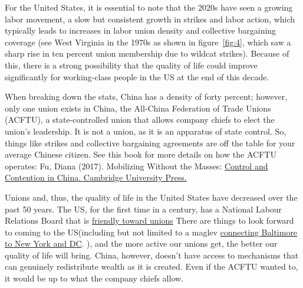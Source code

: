 \documentclass[11pt]{article}\usepackage[]{graphicx}\usepackage[]{xcolor}
\begin{document}
For the United States, it is essential to note that the 2020s have seen a growing labor movement, a slow but consistent growth in strikes and labor action, which typically leads to increases in labor union density and collective bargaining coverage (see West Virginia in the 1970s as shown in figure~\ref{fig:4}, which saw a sharp rise in ten percent union membership due to wildcat strikes). Because of this, there is a strong possibility that the quality of life could improve significantly for working-class people in the US at the end of this decade. 

When breaking down the stats, China has a density of forty percent; however, only one union exists in China, the All-China Federation of Trade Unions (ACFTU), a state-controlled union that allows company chiefs to elect the union's leadership. It is not a union, as it is an apparatus of state control. So, things like strikes and collective bargaining agreements are off the table for your average Chinese citizen. See this book for more details on how the ACFTU operates:  Fu, Diana (2017). Mobilizing Without the Masses: \href{https://www.amazon.com/Mobilizing-without-Masses-Contention-Contentious/dp/1108430414}{Control and Contention in China. Cambridge University Press.}

Unions and, thus, the quality of life in the United States have decreased over the past 50 years. The US, for the first time in a century, has a National Labour Relations Board that is \href {https://www.theguardian.com/us-news/2023/sep/02/union-nlrb-decision-delays-busting}{friendly toward unions} There are things to look forward to coming to the US(including but not limited to a maglev \href{https://northeastmaglev.com/project/}{connecting Baltimore to New York and DC}. ), and the more active our unions get, the better our quality of life will bring. China, however, doesn't have access to mechanisms that can genuinely redistribute wealth as it is created. Even if the ACFTU wanted to, it would be up to what the company chiefs allow. 
\end{document}
